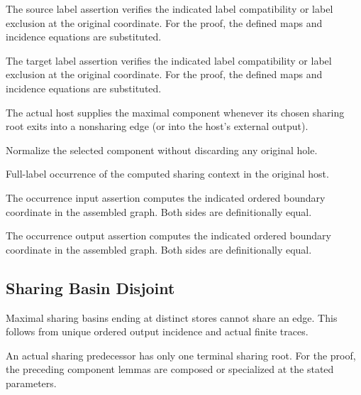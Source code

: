 The source label assertion verifies the indicated label compatibility or label exclusion at the original coordinate.
For the proof, the defined maps and incidence equations are substituted.
\par{}

The target label assertion verifies the indicated label compatibility or label exclusion at the original coordinate.
For the proof, the defined maps and incidence equations are substituted.
\par{}

The actual host supplies the maximal component whenever its chosen sharing root exits into a nonsharing edge (or into the host's external output).
\par{}

Normalize the selected component without discarding any original hole.
\par{}

Full-label occurrence of the computed sharing context in the original host.
\par{}

The occurrence input assertion computes the indicated ordered boundary coordinate in the assembled graph.
Both sides are definitionally equal.
\par{}

The occurrence output assertion computes the indicated ordered boundary coordinate in the assembled graph.
Both sides are definitionally equal.
\par{}

\subsection{Sharing Basin Disjoint}
Maximal sharing basins ending at distinct stores cannot share an edge. This follows from unique ordered output incidence and actual finite traces.

An actual sharing predecessor has only one terminal sharing root.
For the proof, the preceding component lemmas are composed or specialized at the stated parameters.
\par{}

